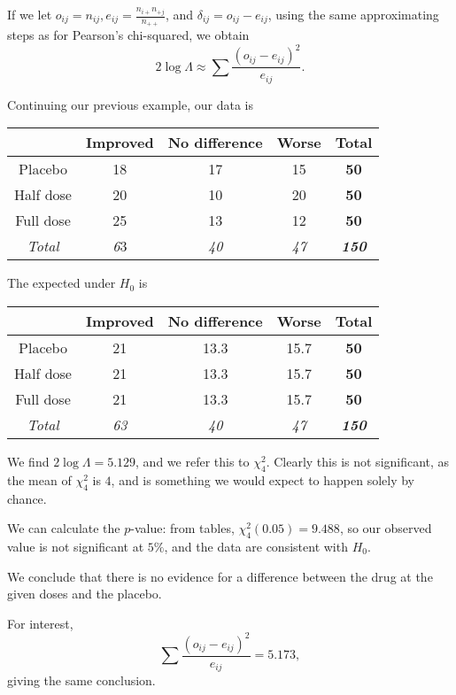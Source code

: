 \documentclass[a4paper]{article}
\begin{document}
If we let $o_{ij}= n_{ij}, e_{ij} = \frac{n_{i+}n_{+j}}{n_{++}}$, and $\delta_{ij} = o_{ij} - e_{ij}$, using the same approximating steps as for Pearson's chi-squared, we obtain
\[
  2\log \Lambda \approx \sum \frac{(o_{ij} - e_{ij})^2}{e_{ij}}.
\]
\begin{eg}
  Continuing our previous example, our data is
  \begin{center}
    \begin{tabular}{ccccc}
      \toprule
      & Improved & No difference & Worse & \textbf{Total}\\\midrule
      Placebo & 18 & 17 & 15 & \textbf{50} \\
      Half dose & 20 & 10 & 20 & \textbf{50} \\
      Full dose & 25 & 13 & 12& \textbf{50} \\\midrule
      \textit{Total} & \textit{6}3 & \textit{40} & \textit{47} & \textbf{\textit{150}} \\ \bottomrule
    \end{tabular}
  \end{center}
  The expected under $H_0$ is
  \begin{center}
    \begin{tabular}{ccccc}
      \toprule
      & Improved & No difference & Worse &\textbf{Total}\\\midrule
      Placebo & 21 & 13.3 & 15.7 & \textbf{50} \\
      Half dose & 21 & 13.3 & 15.7 & \textbf{50}\\
      Full dose & 21 & 13.3 & 15.7 & \textbf{50}\\\midrule
      \textit{Total}& \textit{63} & \textit{40} & \textit{47} & \textbf{\textit{150}}\\ \bottomrule
    \end{tabular}
  \end{center}
  We find $2\log \Lambda = 5.129$, and we refer this to $\chi_4^2$. Clearly this is not significant, as the mean of $\chi_4^2$ is $4$, and is something we would expect to happen solely by chance.

  We can calculate the $p$-value: from tables, $\chi_4^2(0.05) = 9.488$, so our observed value is not significant at $5\%$, and the data are consistent with $H_0$.

  We conclude that there is no evidence for a difference between the drug at the given doses and the placebo.

  For interest,
  \[
    \sum\frac{(o_{ij} - e_{ij})^2}{e_{ij}} = 5.173,
  \]
  giving the same conclusion.
\end{eg}
\end{document}

